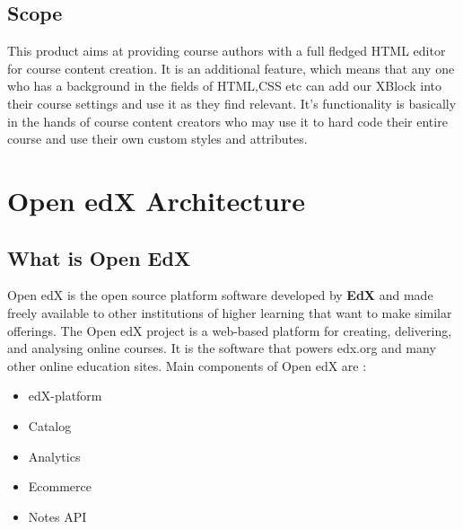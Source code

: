 \section{Scope}
This product aims at providing course authors with a full fledged HTML editor for course content
creation. It is an additional feature, which means that any one who has a background in the fields of
HTML,CSS etc can add our XBlock into their course settings and use it as they find relevant. It’s
functionality is basically in the hands of course content creators who may use it to hard code their
entire course and use their own custom styles and attributes.



\chapter{Open edX Architecture}

\section{What is Open EdX}

Open edX is the open source platform software developed by \textbf{EdX} and made freely available to
other institutions of higher learning that want to make similar offerings. The Open edX project is a
web-based platform for creating, delivering, and analysing online courses. It is the software that
powers edx.org and many other online education sites.\newline\newline
Main components of Open edX are : \newline
\begin{itemize}
	\item edX-platform
	\item Catalog
	\item Analytics
	\item Ecommerce
	\item Notes API
\end{itemize}

